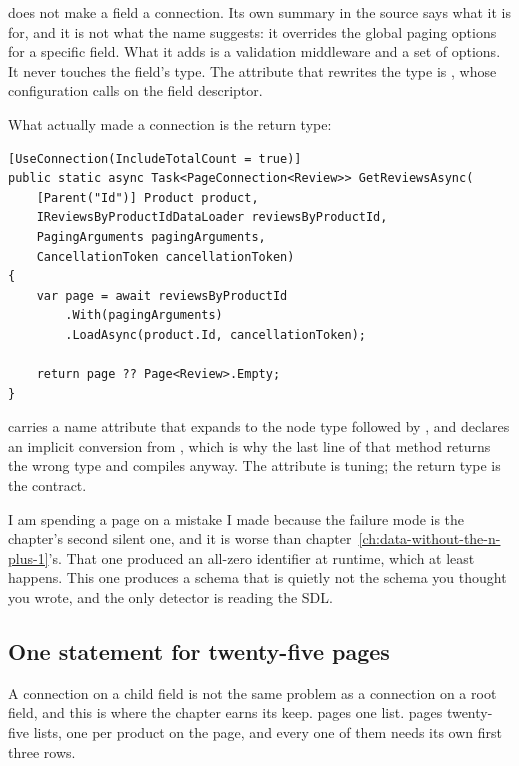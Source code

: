 \code{[UseConnection]} does not make a field a connection. Its own summary in
the source says what it is for, and it is not what the name suggests: it
overrides the global paging options for a specific field. What it adds is a
validation middleware and a set of options. It never touches the field's type.
The attribute that rewrites the type is \code{[UsePaging]}, whose configuration
calls  on the field descriptor.

What actually made  a connection is the return type:

\begin{verbatim}
[UseConnection(IncludeTotalCount = true)]
public static async Task<PageConnection<Review>> GetReviewsAsync(
    [Parent("Id")] Product product,
    IReviewsByProductIdDataLoader reviewsByProductId,
    PagingArguments pagingArguments,
    CancellationToken cancellationToken)
{
    var page = await reviewsByProductId
        .With(pagingArguments)
        .LoadAsync(product.Id, cancellationToken);

    return page ?? Page<Review>.Empty;
}
\end{verbatim}

 carries a name attribute that expands to the node
type followed by , and declares an implicit conversion from
, which is why the last line of that method returns the wrong
type and compiles anyway. The attribute is tuning; the return type is the
contract.

I am spending a page on a mistake I made because the failure mode is the
chapter's second silent one, and it is worse than
chapter~\ref{ch:data-without-the-n-plus-1}'s. That one produced an all-zero
identifier at runtime, which at least happens. This one produces a schema that
is quietly not the schema you thought you wrote, and the only detector is
reading the SDL.

\subsection*{One statement for twenty-five pages}

%
A connection on a child field is not the same problem as a connection on a root
field, and this is where the chapter earns its keep.  pages
one list.  pages twenty-five lists, one per product on the page,
and every one of them needs its own first three rows.

